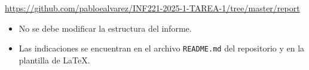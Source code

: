 \begin{mdframed}

\begin{center}
    
    \url{https://github.com/pabloealvarez/INF221-2025-1-TAREA-1/tree/master/report}
        
\end{center}
\end{mdframed}

\begin{itemize}
    \item No se debe modificar la estructura del informe.
    \item Las indicaciones se encuentran en el archivo \texttt{README.md} del repositorio y en la plantilla de \LaTeX. 
\end{itemize}

